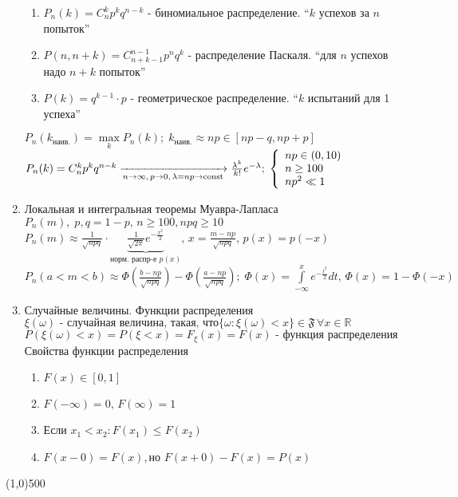 \begin{enumerate}
      \begin{enumerate}
      \item $P_n(k)=C^k_n p^k q^{n-k} $ - биномиальное распределение. ``$k$ успехов за $n$ попыток''
      \item $P(n,n{+}k)=C^{n-1}_{n+k-1}p^n q^k $ - распределение Паскаля. ``для $n$ успехов надо $n{+}k$ попыток''
      \item $P(k)=q^{k-1}\cdot p $ - геометрическое распределение. ``$k$ испытаний для 1 успеха''
      \end{enumerate}
      $P_n(k_\text{наив.})=\max\limits_kP_n(k);\;k_\text{наив.}\approx np \in [np-q,np{+}p] $\\
      $P_n(k)=C^k_n p^k q^{n-k} \xrightarrow[n\rightarrow\infty,\,p\rightarrow 0,\,\lambda=np\rightarrow\operatorname{const}]{} \frac{ \lambda^k }{ k! } e^{ -\lambda };\;\left\{\begin{array}{l}np\in(0,10)\\n\ge 100\\np^2\ll 1\end{array}\right.  $
\item Локальная и интегральная теоремы Муавра-Лапласа\\
      $P_n(m),\;p,q=1-p,\,n\ge 100,npq \ge 10 $\\
      $P_n(m)\approx \frac1{\sqrt{npq}}\cdot \underbrace{\frac1{\sqrt{2\pi}}e^{-\frac{x^2}{2}}}_{\text{норм. распр-е } p(x)},\,x=\frac{m-np}{\sqrt{npq}},\,p(x)=p(-x) $\\
      $P_n(a<m<b)\approx \Phi(\frac{b-np}{\sqrt{npq}})-\Phi(\frac{a-np}{\sqrt{npq}});\;
      \Phi(x)=\int\limits_{-\infty}^x e^{-\frac{t^2}{2}}dt,\,\Phi(x)=1-\Phi(-x) $
\item Случайные величины. Функции распределения\\
      $\xi(\omega)\text{ - случайная величина, такая, что} \{\omega:\xi(\omega)<x\}\in\mathfrak{F}\, \forall x \in \mathbb{R} $\\
      $P(\xi(\omega)<x)=P(\xi<x)=F_\xi(x)=F(x)\text{ - функция распределения} $\\
      Свойства функции распределения
      \begin{enumerate}
      \item $F(x)\in [0,1] $
      \item $F(-\infty)=0,\,F(\infty)=1 $
      \item Если $x_1<x_2 : F(x_1)\le F(x_2)$
      \item $F(x-0)=F(x),\text{но }F(x+0)-F(x)=P(x) $
      \end{enumerate}
\end{enumerate}
\vfill\line(1,0){500}

